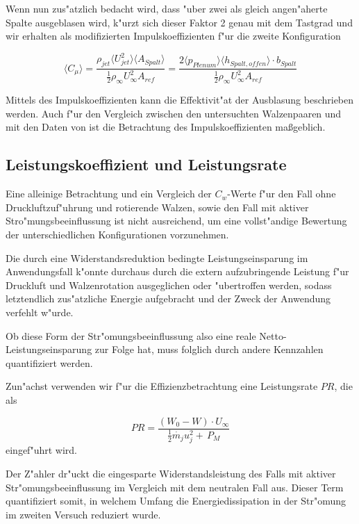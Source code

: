 Wenn nun zus"atzlich bedacht wird, dass "uber zwei als gleich angen"aherte Spalte ausgeblasen wird, k"urzt sich dieser Faktor 2 genau mit dem Tastgrad und wir erhalten als modifizierten Impulskoeffizienten f"ur die zweite Konfiguration

	\begin{equation}
	\label{eq:momentum-coeff-oscill-final}
		\langle{C_{\mu}}\rangle = \frac{\rho_{jet}\langle{U^2_{jet}}\rangle \langle{A_{Spalt}}\rangle} {\frac{1}{2}\rho_{\infty}U^2_{\infty}A_{ref}} = \frac{2\langle{p_{Plenum}}\rangle \langle{h_{Spalt,offen}}\rangle \cdot b_{Spalt}} {\frac{1}{2}\rho_{\infty}U^2_{\infty}A_{ref}}
	\end{equation}

Mittels des Impulskoeffizienten kann die Effektivit"at der Ausblasung beschrieben werden.
Auch f"ur den Vergleich zwischen den untersuchten Walzenpaaren und mit den Daten von \citep{Bilges.2018} ist die Betrachtung des Impulskoeffizienten ma\ss{}geblich.

\subsection{Leistungskoeffizient und Leistungsrate}
Eine alleinige Betrachtung und ein Vergleich der $C_w$-Werte f"ur den Fall ohne Druckluftzuf"uhrung und rotierende Walzen, sowie den Fall mit aktiver Stro"mungsbeeinflussung ist nicht ausreichend, um eine vollst"andige Bewertung der unterschiedlichen Konfigurationen vorzunehmen.

Die durch eine Widerstandsreduktion bedingte Leistungseinsparung im Anwendungsfall k"onnte durchaus durch die extern aufzubringende Leistung f"ur Druckluft und Walzenrotation ausgeglichen oder "ubertroffen werden, sodass letztendlich zus"atzliche Energie aufgebracht und der Zweck der Anwendung verfehlt w"urde.

Ob diese Form der Str"omungsbeeinflussung also eine reale Netto-Leistungseinsparung zur Folge hat, muss folglich durch andere Kennzahlen quantifiziert werden.

Zun"achst verwenden wir f"ur die Effizienzbetrachtung eine Leistungsrate $PR$, die als 

\begin{equation}
	\label{eq:leistungsrate}
	PR = \frac{(W_0 - W)\cdot U_{\infty}}{\frac{1}{2} \dot{m_j} u_j^2 + \, P_M}
\end{equation}
eingef"uhrt wird.\cite{Freund.1994}

Der Z"ahler dr"uckt die eingesparte Widerstandsleistung des Falls mit aktiver Str"omungsbeeinflussung im Vergleich mit dem neutralen Fall aus.
Dieser Term quantifiziert somit, in welchem Umfang die Energiedissipation in der Str"omung im zweiten Versuch reduziert wurde.


